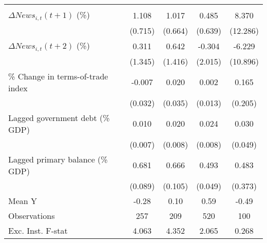 {\begin{tabular}{l*{4}{c}}
                    &                     &                     &                     &                     \\
\addlinespace
$ \Delta News_{i,t}(t+1)$ (\%)&       1.108         &       1.017         &       0.485         &       8.370         \\
                    &     (0.715)         &     (0.664)         &     (0.639)         &    (12.286)         \\
\addlinespace
$ \Delta News_{i,t}(t+2)$ (\%)&       0.311         &       0.642         &      -0.304         &      -6.229         \\
                    &     (1.345)         &     (1.416)         &     (2.015)         &    (10.896)         \\
\addlinespace
\% Change in terms-of-trade index&      -0.007         &       0.020         &       0.002         &       0.165         \\
                    &     (0.032)         &     (0.035)         &     (0.013)         &     (0.205)         \\
\addlinespace
Lagged government debt (\% GDP)&       0.010         &       0.020\sym{***}&       0.024\sym{***}&       0.030         \\
                    &     (0.007)         &     (0.008)         &     (0.008)         &     (0.049)         \\
\addlinespace
Lagged primary balance (\% GDP)&       0.681\sym{***}&       0.666\sym{***}&       0.493\sym{***}&       0.483         \\
                    &     (0.089)         &     (0.105)         &     (0.049)         &     (0.373)         \\
\midrule
Mean Y              &       -0.28         &        0.10         &        0.59         &       -0.49         \\
Observations        &         257         &         209         &         520         &         100         \\
Exc. Inst. F-stat   &       4.063         &       4.352         &       2.065         &       0.268         \\
\bottomrule
\end{tabular}
}
